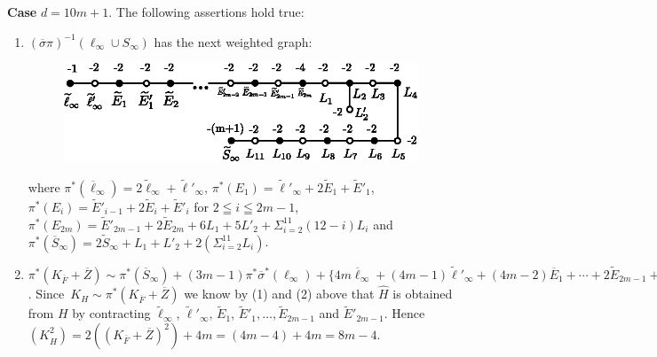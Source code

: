 \subsubsection{}\label{chap3:3.6.1}
{\bf Case} $d=10m+1$. The following assertions hold true:
\begin{enumerate}
\renewcommand{\labelenumi}{(\theenumi)}
\item $(\overline{\sigma}\pi)^{-1}(\ell_{\infty}\cup S_{\infty})$ has
  the next weighted graph:
\begin{figure}[H]
\centering
\includegraphics[scale=1.1]{figures/miyansi_fig44.eps}
\end{figure}
\noindent
where
$\pi^{\ast}(\overline{\ell}_{\infty})=2\widetilde{\ell}_{\infty}+\widetilde{\ell}'_{\infty}$,
$\pi^{\ast}(E_{1})=\widetilde{\ell}'_{\infty}+2\widetilde{E}_{1}+\widetilde{E}'_{1}$,
$\pi^{\ast}(E_{i})=\widetilde{E}'_{i-1}+2\widetilde{E}_{i}+\widetilde{E}'_{i}$
for $2\leqq i\leqq 2m-1$,
$\pi^{\ast}(E_{2m})=\widetilde{E}'_{2m-1}+2\widetilde{E}_{2m}+6L_{1}+5L'_{2}+\Sigma^{11}_{i=2}(12-i)L_{i}$
and
$\pi^{\ast}(\overline{S}_{\infty})=2\widetilde{S}_{\infty}+L_{1}+L'_{2}+2
(\Sigma^{11}_{i=2}L_{i})$.

\item
  $\pi^{\ast}(K_{\overline{F}}+\overline{Z})\sim\pi^{\ast}(\overline{S}_{\infty})+(3m-1)\pi^{\ast}\overline{\sigma}^{\ast}(\ell_{\infty})+\{4m\overline{\ell}_{\infty}+(4m-1)\widetilde{\ell}'_{\infty}+(4m-2)\overline{E}_{1}+\cdots+2\widetilde{E}_{2m-1}+\widetilde{E}'_{2m-1}\}$. Since\pageoriginale\
  $K_{H}\sim\pi^{\ast}(K_{\overline{F}}+\overline{Z})$ we know by (1)
  and (2) above that $\widehat{H}$ is obtained from $H$ by contracting
  $\widetilde{\ell}_{\infty}$, $\widetilde{\ell}'_{\infty}$,
  $\widetilde{E}_{1}$,
  $\widetilde{E}'_{1},\ldots,\widetilde{E}_{2m-1}$ and
  $\widetilde{E}'_{2m-1}$. Hence
  $(K^{2}_{\widehat{H}})=2((K_{\overline{F}}+\overline{Z})^{2})+4m=(4m-4)+4m=8m-4$.  
\end{enumerate}

